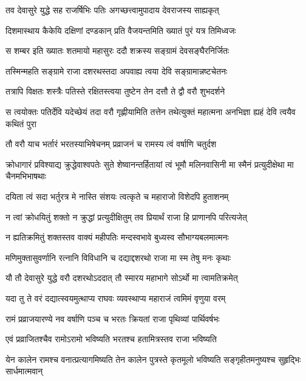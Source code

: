 \twolineshloka
{तव देवासुरे युद्धे सह राजर्षिभिः पतिः}
{अगच्छत्त्वामुपादाय देवराजस्य साह्यकृत्} %

\twolineshloka
{दिशमास्थाय कैकेयि दक्षिणां दण्डकान् प्रति}
{वैजयन्तमिति ख्यातं पुरं यत्र तिमिध्वजः} %

\twolineshloka
{स शम्बर इति ख्यातः शतमायो महासुरः}
{ददौ शक्रस्य सङ्ग्रामं देवसङ्घैरनिर्जितः} %

\twolineshloka
{तस्मिन्महति सङ्ग्रामे राजा दशरथस्तदा}
{अपवाह्य त्वया देवि सङ्ग्रामान्नष्टचेतनः} %

\twolineshloka
{तत्रापि विक्षतः शस्त्रैः पतिस्ते रक्षितस्त्वया}
{तुष्टेन तेन दत्तौ ते द्वौ वरौ शुभदर्शने} %

\threelineshloka
{स त्वयोक्तः पतिर्देवि यदेच्छेयं तदा वरौ}
{गृह्णीयामिति तत्तेन तथेत्युक्तं महात्मना}
{अनभिज्ञा ह्यहं देवि त्वयैव कथितं पुरा} %

\twolineshloka
{तौ वरौ याच भर्तारं भरतस्याभिषेचनम्}
{प्रव्राजनं च रामस्य त्वं वर्षाणि चतुर्दश} %

\threelineshloka
{क्रोधागारं प्रविश्याद्य क्रुद्धेवाश्वपतेः सुते}
{शेष्वानन्तर्हितायां त्वं भूमौ मलिनवासिनी}
{मा स्मैनं प्रत्युदीक्षेथा मा चैनमभिभाषथाः} %

\twolineshloka
{दयिता त्वं सदा भर्तुरत्र मे नास्ति संशयः}
{त्वत्कृते च महाराजो विशेदपि हुताशनम्} %

\twolineshloka
{न त्वां क्रोधयितुं शक्तो न क्रुद्धां प्रत्युदीक्षितुम्}
{तव प्रियार्थं राजा हि प्राणानपि परित्यजेत्} %

\twolineshloka
{न ह्यतिक्रमितुं शक्तस्तव वाक्यं महीपतिः}
{मन्दस्वभावे बुध्यस्व सौभाग्यबलमात्मनः} %

\twolineshloka
{मणिमुक्तासुवर्णानि रत्नानि विविधानि च}
{दद्याद्दशरथो राजा मा स्म तेषु मनः कृथाः} %

\twolineshloka
{यौ तौ देवासुरे युद्धे वरौ दशरथोऽददात्}
{तौ स्मारय महाभागे सोऽर्थो मा त्वामतिक्रमेत्} %

\twolineshloka
{यदा तु ते वरं दद्यात्स्वयमुत्थाप्य राघवः}
{व्यवस्थाप्य महाराजं त्वमिमं वृणुया वरम्} %

\twolineshloka
{रामं प्रव्राजयारण्ये नव वर्षाणि पञ्च च}
{भरतः क्रियतां राजा पृथिव्यां पार्थिवर्षभः} %

\twolineshloka
{एवं प्रव्राजितश्चैव रामोऽरामो भविष्यति}
{भरतश्च हतामित्रस्तव राजा भविष्यति} %

\threelineshloka
{येन कालेन रामश्च वनात्प्रत्यागमिष्यति}
{तेन कालेन पुत्रस्ते कृतमूलो भविष्यति}
{सङ्गृहीतमनुष्यश्च सुहृद्भिः सार्धमात्मवान्} %

